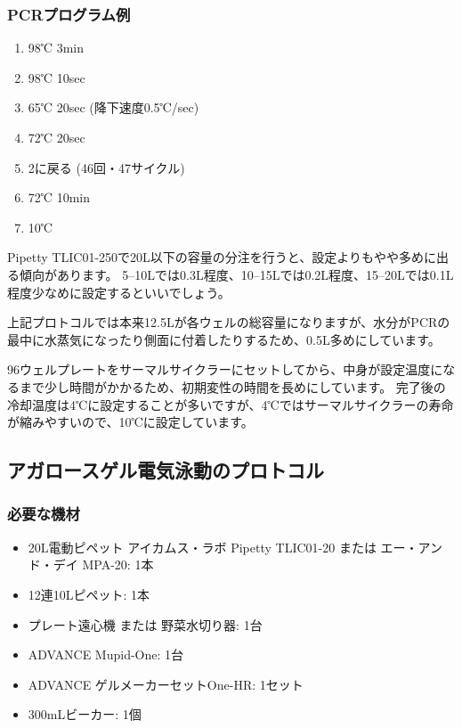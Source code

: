 \documentclass[titlepage,10pt,a4paper,uplatex]{jsbook}
\begin{document}
\subsubsection{PCRプログラム例}
\begin{enumerate}
\item 98℃ 3min
\item 98℃ 10sec
\item 65℃ 20sec (降下速度0.5℃/sec)
\item 72℃ 20sec
\item 2に戻る (46回・47サイクル)
\item 72℃ 10min
\item 10℃
\end{enumerate}

Pipetty TLIC01-250で20{\textmu}L以下の容量の分注を行うと、設定よりもやや多めに出る傾向があります。
5--10{\textmu}Lでは0.3{\textmu}L程度、10--15{\textmu}Lでは0.2{\textmu}L程度、15--20{\textmu}Lでは0.1{\textmu}L程度少なめに設定するといいでしょう。

上記プロトコルでは本来12.5{\textmu}Lが各ウェルの総容量になりますが、水分がPCRの最中に水蒸気になったり側面に付着したりするため、0.5{\textmu}L多めにしています。

96ウェルプレートをサーマルサイクラーにセットしてから、中身が設定温度になるまで少し時間がかかるため、初期変性の時間を長めにしています。
完了後の冷却温度は4℃に設定することが多いですが、4℃ではサーマルサイクラーの寿命が縮みやすいので、10℃に設定しています。

\subsection{アガロースゲル電気泳動のプロトコル}

\subsubsection{必要な機材}
\begin{itemize}
\item 20{\textmu}L電動ピペット アイカムス・ラボ Pipetty TLIC01-20 または エー・アンド・デイ MPA-20: 1本
\item 12連10{\textmu}Lピペット: 1本
\item プレート遠心機 または 野菜水切り器: 1台
\item ADVANCE Mupid-One: 1台
\item ADVANCE ゲルメーカーセットOne-HR: 1セット
\item 300mLビーカー: 1個
\end{itemize}
\end{document}
